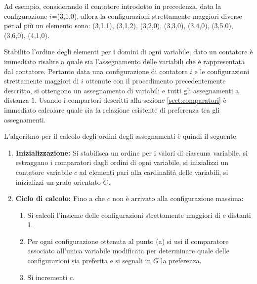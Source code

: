 Ad esempio, considerando il contatore introdotto in precedenza, data
la configurazione $i$=(3,1,0), allora la configurazioni strettamente
maggiori diverse per al più un elemento sono: (3,1,1), (3,1,2),
(3,2,0), (3,3,0), (3,4,0), (3,5,0), (3,6,0), (4,1,0).

Stabilito l'ordine degli elementi per i domini di ogni variabile, dato
un contatore è immediato risalire a quale sia l'assegnamento delle
variabili che è rappresentata dal contatore. Pertanto data una
configurazione di contatore $i$ e le configurazioni strettamente
maggiori di $i$ ottenute con il procedimento precedentemente
descritto, si ottengono un assegnamento di variabili e tutti gli
assegnamenti a distanza 1. Usando i compartori descritti alla sezione
\ref{sect:comparatori} è immediato calcolare quale sia la relazione
esistente di preferenza tra gli assegnamenti.

L'algoritmo per il calcolo degli ordini degli assegnamenti è quindi il
seguente:
\begin{enumerate}
\item \textbf{Inizializzazione:} Si stabilisca un ordine per i valori
  di ciascuna variabile, si estraggano i comparatori dagli ordini di
  ogni variabile, si inizializzi un contatore variabile $c$ ad
  elementi pari alla cardinalità delle variabili, si inizializzi un
  grafo orientato $G$.
\item \textbf{Ciclo di calcolo:} Fino a che $c$ non è arrivato alla
  configurazione massima:
  \begin{enumerate}
  \item Si calcoli l'insieme delle configurazioni strettamente
    maggiori di $c$ distanti 1.
  \item Per ogni configurazione ottenuta al punto (a) si usi il
    comparatore associato all'unica variabile modificata per
    determinare quale delle configurazioni sia preferita e si segnali
    in $G$ la preferenza.
  \item Si incrementi $c$.
  \end{enumerate}
\end{enumerate}


